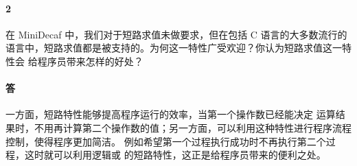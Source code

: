 \documentclass[UTF8]{ctexart}
\begin{document}
        \paragraph{2} 在 MiniDecaf 中，我们对于短路求值未做要求，但在包括 C 语言的大多数流行的
        语言中，短路求值都是被支持的。为何这一特性广受欢迎？你认为短路求值这一特性会
        给程序员带来怎样的好处？
        \paragraph{答} 一方面，短路特性能够提高程序运行的效率，当第一个操作数已经能决定
        运算结果时，不用再计算第二个操作数的值；另一方面，可以利用这种特性进行程序流程
        控制，使得程序更加简洁。
        例如希望第一个过程执行成功时不再执行第二个过程，这时就可以利用逻辑或
        的短路特性，这正是给程序员带来的便利之处。
\end{document}
